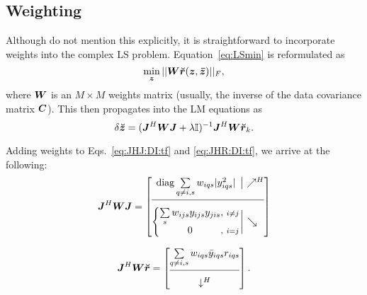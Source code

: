 \documentclass[useAMS,usenatbib]{mn2e}
\makeatletter
\newcommand{\II}{\mathbb{I}}
\newcommand{\mat}[1]{{\bmath{#1}}}
\newcommand{\JJ}{\mat{J}} %
\newcommand{\MM}{\mat{M}}
\newcommand{\GG}{\mat{G}}
\newcommand{\Matrix}[2]{\left [ \begin{array}{@{}#1@{}}#2\end{array} \right ]}
\newcommand{\Stack}[1]{\begin{array}{@{}c@{}}#1\end{array}}
\newcommand{\AUG}[1]{\bmath{\breve{#1}}}
\newcommand{\Zz}{\AUG{z}}
\newcommand{\Rr}{\AUG{r}}
\numberwithin{equation}{section}
\makeatother
\begin{document}
\subsection{Weighting}
\label{sec:DI:W}

Although \citet{ComplexOpt} do not mention this explicitly, it is straightforward to incorporate weights into the 
complex LS problem. Equation~\ref{eq:LSmin} is reformulated as
\begin{equation}
\label{eq:LSmin:w}
\min_{\bmath{z}} ||\mat{W} \Rr(\bmath{z},\bmath{\bar z})||_F,
\end{equation}
where $\mat{W}$ is an $M\times M$ weights matrix (usually, the inverse of the data covariance matrix $\mat{C}$). This then propagates into the LM equations as
\begin{equation}
\label{eq:LM:W}
\delta\Zz = (\JJ^H \mat{W} \JJ + \lambda\II)^{-1}\JJ^H \mat{W} \Rr_k.
\end{equation}

Adding weights to Eqs.~\ref{eq:JHJ:DI:tf} and \ref{eq:JHR:DI:tf}, we arrive at the following:
\begin{equation}
\label{eq:JHJ:DI:tfw}
\JJ^H\mat{W}\JJ = 
\JHJblocks{
  \mathrm{diag} \sum\limits_{q\ne i,s} w_{iqs} |y^2_{iqs}|
}{
  \left \{ 
  \begin{array}{@{}c@{,~}c@{}}
   \sum\limits_{s} w_{ijs} y_{ijs}y_{jis}&{\scriptstyle i\ne j} \\
   0 &{\scriptstyle i=j}
  \end{array} \right . 
}
\end{equation}

\begin{equation}
\label{eq:JHR:DI:tfw}
\JJ^H\mat{W}\Rr 
= \Matrix{c}{
\sum\limits_{q\ne i,s} w_{iqs} \bar{y}_{iqs} r_{iqs}   \\
\hline\\[-8pt]
\downarrow^H
}.
\end{equation}


\newcommand{\GGd}{\GG^{(d)}}
\newcommand{\GGdH}{\GG^{(d)H}}
\newcommand{\MMd}{\MM^{(d)}}
\newcommand{\YYd}{\YY^{(d)}}
\newcommand{\YYdH}{\YY^{(d)H}}
\newcommand{\YYc}{\YY^{(c)}}
\newcommand{\YYcH}{\YY^{(c)H}}
\newcommand{\ggd}{g^{(d)}}
\newcommand{\ggdH}{\bar{g}^{(d)}}
\newcommand{\ggc}{g^{(c)}}
\newcommand{\ggcH}{\bar{g}^{(c)}}
\newcommand{\mmc}{m^{(c)}}
\newcommand{\mmd}{m^{(d)}}
\newcommand{\mmcH}{\bar{m}^{(c)}}
\newcommand{\mmdH}{\bar{m}^{(d)}}
\newcommand{\yyd}{y^{(d)}}
\newcommand{\yydH}{\bar{y}^{(d)}}
\newcommand{\yyc}{y^{(c)}}
\newcommand{\yycH}{\bar{y}^{(c)}}
\end{document}
